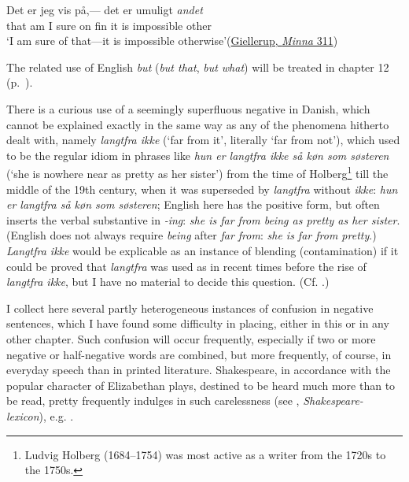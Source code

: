 \ex 
\gll Det er jeg vis på,--- det er umuligt \emph{andet}\\ %
 that am I sure on fin it is impossible other\\
\glt `I am sure of that---it is impossible otherwise'\hfill(\href{https://tekster.kb.dk/text/adl-texts-gjellerup01-shoot-workid54089#idm139731117574624}{Giellerup, \textit{Minna} 311}) %
\z
\z
{}

The related use of English \textit{but} (\textit{but that}, \textit{but what}) will be treated in chapter 12 (p.~\pageref{ch:12}).


There is a curious use of a seemingly superfluous negative in Danish, which cannot be explained exactly in the same way as any of the phenomena hitherto dealt with, namely \textit{langtfra ikke} (`far from it', literally `far from not'), which used to be the regular idiom in phrases like \textit{hun er langtfra ikke så køn som søsteren} (`she is nowhere near as pretty as her sister') from the time of Holberg\footnote{Ludvig Holberg (1684--1754) was most active as a writer from the 1720s to the 1750s. \eds} till the middle of the 19th century, when it was superseded by \textit{langtfra} without \textit{ikke}: \textit{hun er langtfra så køn som søsteren}; English here has the positive form, but often inserts the verbal substantive in \textit{-ing}: \textit{she is far from being as pretty as her sister}. (English does not always require \textit{being} after \textit{far from}: \textit{she is far from pretty}.) \textit{Langtfra ikke} would be explicable as an instance of blending (contamination) if it could be proved that \textit{langtfra} was used as in recent times before the rise of \textit{langtfra ikke}, but I have no material to decide this question. (Cf. \cite{levin1861dagbladet}.) %


I collect here several partly heterogeneous instances of confusion in negative sentences, which I have found some difficulty in placing, either in this or in any other chapter. Such confusion will occur frequently, especially if two or more negative or half-negative words are combined, but more frequently, of course, in everyday speech than in printed literature. Shakespeare, in accordance with the popular character of Elizabethan plays, destined to be heard much more than to be read, pretty frequently indulges in such carelessness (see \cite[\href{https://archive.org/details/shakespearelexic02schmuoft/page/1420/mode/2up?view=theater}{1420}]{schmidt1886}, \textit{Shakespeare-lexicon}), %
e.g. .\largerpage[2]

